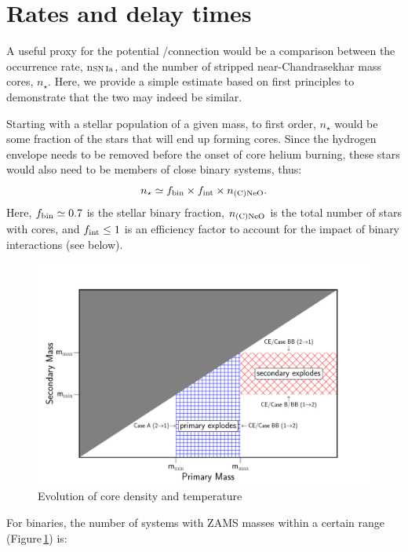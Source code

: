 \documentclass[twocolumn,tighten,times]{aastex62}
\begin{document}
\section{Rates and delay times}\label{sec:4}
A useful proxy for the potential \one/\ia connection would be a comparison between 
the \ia occurrence rate, n$_{\rm SN\,Ia}$, and the number of stripped  near-Chandrasekhar mass \one cores, $n_\star$.  Here, we provide a simple estimate based
on first principles to demonstrate that the two may indeed be similar. 

Starting with a stellar population of a given mass, to first order, $n_\star$ would be some fraction of the stars that will end up forming   \one cores. Since the hydrogen envelope needs to be removed before the onset of core helium burning, these stars would also need to be members of close  binary systems, thus:  
\begin{equation}
n_{\star} \simeq  f_{\rm bin} \times f_{\rm int} \times  n_{\rm \one}.
\end{equation}
Here, $f_{\rm bin}\simeq 0.7$ \citep{Sana:2012px} is the stellar binary fraction,   $n_{\rm \one}$ is the total 
number of stars with \one cores, and $f_{\rm int}\leq 1$ is an efficiency factor to account for the impact of binary interactions (see below).
\begin{figure}[htb!]
\begin{center}
\includegraphics[width=1\textwidth]{formation_regimes.pdf}
\caption{Evolution of core density and temperature }
\label{fig:rates}
\end{center}
\end{figure}
For binaries, the number of systems with ZAMS masses within a certain range (Figure\,\ref{fig:rates}) is:
\end{document}
